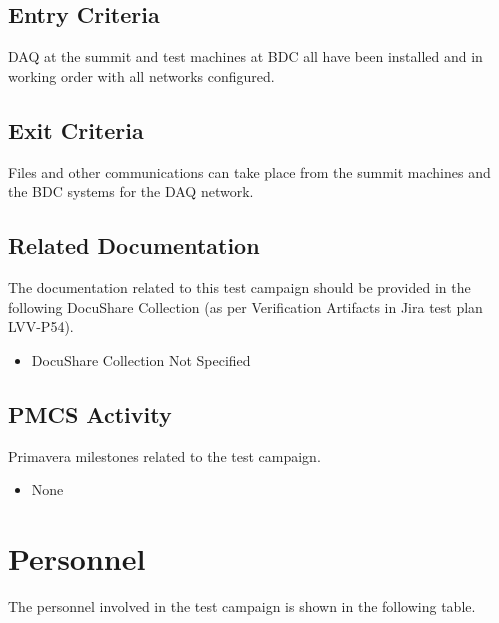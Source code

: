 \documentclass[DM,lsstdraft,STR,toc]{lsstdoc}
\begin{document}
  \subsection{Entry Criteria}
  DAQ at the summit and test machines at BDC all have been installed and
in working order with all networks configured.~~

  \subsection{Exit Criteria}
  Files and other communications can take place from the summit machines
and the BDC systems for the DAQ network.~~


\subsection{Related Documentation}

The documentation related to this test campaign should be provided in the following DocuShare Collection
(as per Verification Artifacts in Jira test plan LVV-P54).

\begin{itemize}
\item DocuShare Collection Not Specified
\end{itemize}



\subsection{PMCS Activity}

Primavera milestones related to the test campaign.

\begin{itemize}
\item None
\end{itemize}


\newpage
\section{Personnel}
\label{sect:personnel}

The personnel involved in the test campaign is shown in the following table.
\end{document}
